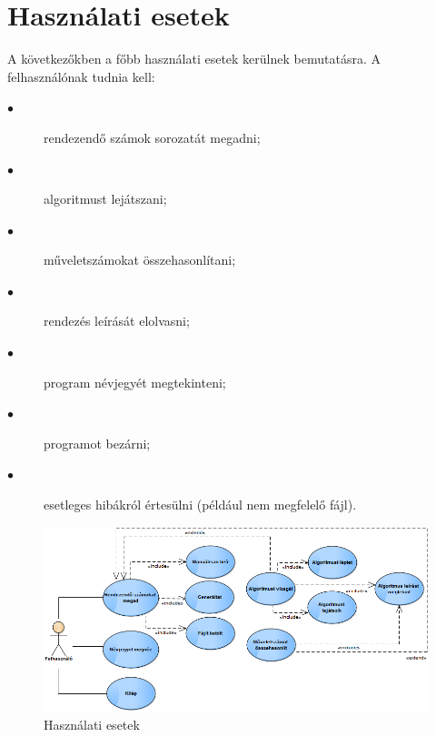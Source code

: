 \documentclass{elteikthesis}
\begin{document}
\section{Használati esetek}
A következőkben a főbb használati esetek kerülnek bemutatásra. A felhasználónak tudnia kell:\par
\begin{description}
	\item[$\bullet$] rendezendő számok sorozatát megadni;
	\item[$\bullet$] algoritmust lejátszani;
	\item[$\bullet$] műveletszámokat összehasonlítani;
	\item[$\bullet$] rendezés leírását elolvasni;
	\item[$\bullet$] program névjegyét megtekinteni;
	\item[$\bullet$] programot bezárni;
	\item[$\bullet$] esetleges hibákról értesülni (például nem megfelelő fájl).
\end{description}
\begin{figure}[H]
	\centering
	\includegraphics[width=\textwidth]{pics/usecase.png}
	\caption{Használati esetek}
\end{figure}\par
\end{document}

